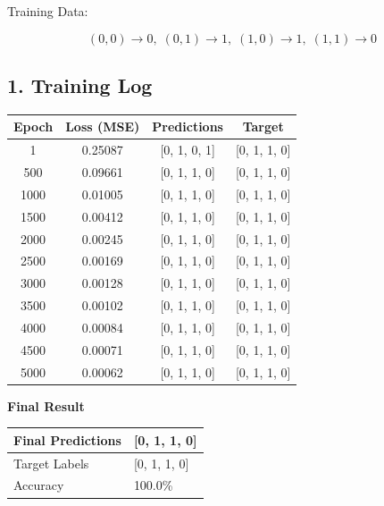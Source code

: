 \documentclass[11pt]{article}
\begin{document}
\vspace{2mm}

Training Data:

\[
(0,0)\rightarrow0,\;
(0,1)\rightarrow1,\;
(1,0)\rightarrow1,\;
(1,1)\rightarrow0
\]

\vspace{3mm}

\subsection*{1. Training Log}

\begin{center}
\begin{tabular}{|c|c|c|c|}
\hline
\textbf{Epoch} & \textbf{Loss (MSE)} & \textbf{Predictions} & \textbf{Target}\\
\hline
1    & 0.25087 & [0, 1, 0, 1] & [0, 1, 1, 0]\\
\hline
500  & 0.09661 & [0, 1, 1, 0] & [0, 1, 1, 0]\\
\hline
1000 & 0.01005 & [0, 1, 1, 0] & [0, 1, 1, 0]\\
\hline
1500 & 0.00412 & [0, 1, 1, 0] & [0, 1, 1, 0]\\
\hline
2000 & 0.00245 & [0, 1, 1, 0] & [0, 1, 1, 0]\\
\hline
2500 & 0.00169 & [0, 1, 1, 0] & [0, 1, 1, 0]\\
\hline
3000 & 0.00128 & [0, 1, 1, 0] & [0, 1, 1, 0]\\
\hline
3500 & 0.00102 & [0, 1, 1, 0] & [0, 1, 1, 0]\\
\hline
4000 & 0.00084 & [0, 1, 1, 0] & [0, 1, 1, 0]\\
\hline
4500 & 0.00071 & [0, 1, 1, 0] & [0, 1, 1, 0]\\
\hline
5000 & 0.00062 & [0, 1, 1, 0] & [0, 1, 1, 0]\\
\hline
\end{tabular}
\end{center}

\vspace{3mm}

\textbf{Final Result}

\begin{center}
\begin{tabular}{|p{6cm}|p{6cm}|}
\hline
Final Predictions & [0, 1, 1, 0]\\
\hline
Target Labels & [0, 1, 1, 0]\\
\hline
Accuracy & 100.0\%\\
\hline
\end{tabular}
\end{center}
\end{document}
